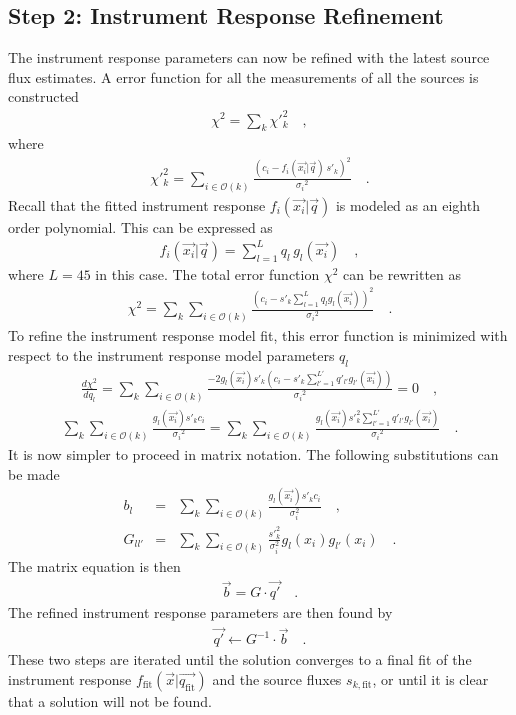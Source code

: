\documentclass[manuscript]{aastex}
\newcommand{\fit}{\text{fit}}
\begin{document}
\subsection{Step 2: Instrument Response Refinement}
The instrument response parameters can now be refined with the latest source flux estimates. A error function for all the measurements of all the sources is constructed
\begin{eqnarray*}
\chi^2 = \sum_{k} \chi'^2_k \quad ,
\end{eqnarray*}
where
\begin{eqnarray*}
\chi'^2_k = \sum_{i \in \mathcal{O}(k)} \frac{(c_i-f_{i}(\vec{x_i} | \vec{q}) \, s'_{k})^2}{{\sigma_i}^2}  \quad .
\end{eqnarray*}
Recall that the fitted instrument response $f_{i}(\vec{x_i} | \vec{q})$ is modeled as an eighth order polynomial. This can be expressed as
\begin{eqnarray*}
f_{i}(\vec{x_i} | \vec{q}) = \sum_{l = 1}^L q_{l} \, g_l(\vec{x_i})  \quad ,
\end{eqnarray*}
where $L = 45$ in this case. The total error function $\chi^2$ can be rewritten as
\begin{eqnarray*}
\chi^2 =\sum_{k} \sum_{i \in \mathcal{O}(k)} \frac{(c_i- s'_{k} \sum_{l = 1}^L q_{l} g_l(\vec{x_i}))^2}{{\sigma_i}^2}   \quad .
\end{eqnarray*}
To refine the instrument response model fit, this error function is minimized with respect to the instrument response model parameters $q_{l}$
\begin{eqnarray*}
\frac{d\chi^2}{dq_{l}} = \sum_{k} \sum_{i \in \mathcal{O}(k)} \frac{-2 g_l(\vec{x_i}) s'_{k} (c_i- s'_{k} \sum_{l' = 1}^{L'} q'_{l'} g_{l'}(\vec{x_i}))}{{\sigma_i}^2} = 0  \quad ,
\end{eqnarray*}
\begin{eqnarray*}
\sum_{k} \sum_{i \in \mathcal{O}(k)} \frac{g_l(\vec{x_i}) s'_{k} c_i}{{\sigma_i}^2} = \sum_{k} \sum_{i \in \mathcal{O}(k)} \frac{g_l (\vec{x_i}) s'^2_{k} \sum_{l' = 1}^{L'} q'_{l'} g_{l'} (\vec{x_i})} {{\sigma_i}^2}   \quad .
\end{eqnarray*}
It is now simpler to proceed in matrix notation. The following substitutions can be made
\begin{eqnarray}
b_l & = & \sum_{k} \sum_{i \in \mathcal{O}(k)} \frac{g_l(\vec{x_i}) s'_{k} c_i}{\sigma_i^2}    \quad ,\\
G_{ll'} & = & \sum_{k} \sum_{i \in \mathcal{O}(k)} \frac{{s'}_{k}^2}{\sigma_i^2} g_l(x_i) g_{l'}(x_i)   \quad .
\end{eqnarray}
The matrix equation is then
\begin{eqnarray*}
\vec{b} = G \cdot \vec{q'}    \quad .
\end{eqnarray*}
The refined instrument response parameters are then found by
\begin{eqnarray*}
\vec{q'} \leftarrow G^{-1}  \cdot \vec{b}   \quad .
\end{eqnarray*}
These two steps are iterated until the solution converges to a final fit of the instrument response $f_\fit(\vec{x} | \vec{q_\fit})$ and the source fluxes $s_{k,\fit}$, or until it is clear that a solution will not be found. 
\end{document}
